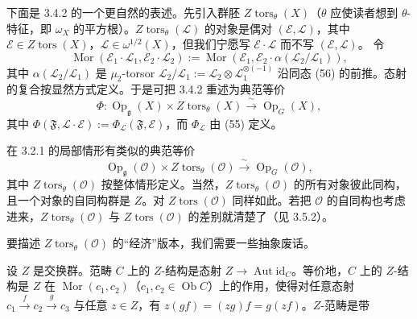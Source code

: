  下面是 3.4.2 的一个更自然的表述。先引入群胚 $Z\operatorname{tors}_{\theta}(X)$（$\theta$ 应使读者想到 $\theta$-特征，即 $\omega_{X}$ 的平方根）。$Z\operatorname{tors}_{\theta}(\mathcal{L})$ 的对象是偶对 $(\mathcal{E},\mathcal{L})$，其中 $\mathcal{E}\in Z\operatorname{tors}(X)$，$\mathcal{L}\in\omega^{1/2}(X)$，但我们宁愿写 $\mathcal{E}\cdot\mathcal{L}$ 而不写 $(\mathcal{E},\mathcal{L})$。
令
\[
  \operatorname{Mor}(\mathcal{E}_{1}\cdot\mathcal{L}_{1},\mathcal{E}_{2}\cdot\mathcal{L}_{2})
  :=\operatorname{Mor}(\mathcal{E}_{1},\mathcal{E}_{2}\cdot\alpha(\mathcal{L}_{2}/\mathcal{L}_{1})),
\]
其中 $\alpha(\mathcal{L}_{2}/\mathcal{L}_{1})$ 是 $\mu_{2}$-torsor $\mathcal{L}_{2}/\mathcal{L}_{1}:=\mathcal{L}_{2}\otimes\mathcal{L}_{1}^{\otimes(-1)}$ 沿同态 (56) 的前推。态射的复合按显然方式定义。于是可把 3.4.2 重述为典范等价
\begin{equation}\tag{57}
  \Phi : \operatorname{Op}_{\mathfrak{g}}(X)\times Z\operatorname{tors}_{\theta}(X)\xrightarrow{\ \sim\ }\operatorname{Op}_{G}(X),
\end{equation}
其中 $\Phi(\mathfrak{F},\mathcal{L}\cdot\mathcal{E}):=\Phi_{\mathcal{L}}(\mathfrak{F},\mathcal{E})$，而 $\Phi_{\mathcal{L}}$ 由 (55) 定义。

在 3.2.1 的局部情形有类似的典范等价
\begin{equation}\tag{58}
  \operatorname{Op}_{\mathfrak{g}}(\mathcal{O})\times Z\operatorname{tors}_{\theta}(\mathcal{O})\xrightarrow{\ \sim\ }\operatorname{Op}_{G}(\mathcal{O}),
\end{equation}
其中 $Z\operatorname{tors}_{\theta}(\mathcal{O})$ 按整体情形定义。当然，$Z\operatorname{tors}_{\theta}(\mathcal{O})$ 的所有对象彼此同构，且一个对象的自同构群是 $Z$。对 $Z\operatorname{tors}(\mathcal{O})$ 同样如此。若把 $\mathcal{O}$ 的自同构也考虑进来，$Z\operatorname{tors}_{\theta}(\mathcal{O})$ 与 $Z\operatorname{tors}(\mathcal{O})$ 的差别就清楚了（见 3.5.2）。

 要描述 $Z\operatorname{tors}_{\theta}(\mathcal{O})$ 的“经济”版本，我们需要一些抽象废话。

设 $Z$ 是交换群。范畴 $C$ 上的 $Z$-结构是态射 $Z\to\operatorname{Aut}\mathrm{id}_{C}$。等价地，$C$ 上的 $Z$-结构是 $Z$ 在 $\operatorname{Mor}(c_{1},c_{2})$（$c_{1},c_{2}\in\operatorname{Ob}C$）上的作用，使得对任意态射 $c_{1}\xrightarrow{f}c_{2}\xrightarrow{g}c_{3}$ 与任意 $z\in Z$，有 $z(gf)=(zg)f=g(zf)$。$Z$-范畴是带

